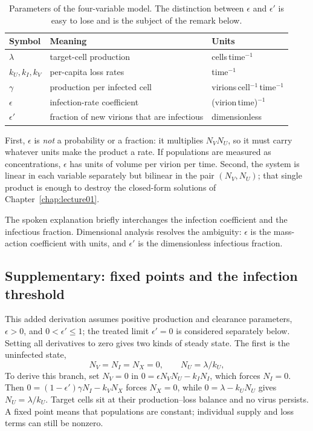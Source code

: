 \begin{table}[H]
\centering\small
\begin{tabular}{@{}l p{6.9cm} l@{}}
\toprule
Symbol & Meaning & Units\\
\midrule
$\lambda$ & target-cell production & cells\,time$^{-1}$\\
$k_U,k_I,k_V$ & per-capita loss rates & time$^{-1}$\\
$\gamma$ & production per infected cell & virions\,cell$^{-1}$\,time$^{-1}$\\
$\epsilon$ & infection-rate coefficient & (virion\,time)$^{-1}$\\
$\epsilon'$ & fraction of new virions that are infectious & dimensionless\\
\bottomrule
\end{tabular}
\caption{Parameters of the four-variable model. The distinction between $\epsilon$ and $\epsilon'$ is easy to lose and is the subject of the remark below.}\label{tab:lec02-params}
\end{table}

First, $\epsilon$ is \emph{not} a probability or a fraction: it multiplies $N_VN_U$, so it must carry whatever units make the product a rate. If populations are measured as concentrations, $\epsilon$ has units of volume per virion per time. Second, the system is linear in each variable separately but bilinear in the pair $(N_V,N_U)$; that single product is enough to destroy the closed-form solutions of Chapter~\ref{chap:lecture01}.

\begin{remark}
The spoken explanation briefly interchanges the infection coefficient and the infectious fraction. Dimensional analysis resolves the ambiguity: $\epsilon$ is the mass-action coefficient with units, and $\epsilon'$ is the dimensionless infectious fraction.
\end{remark}

\subsection{Supplementary: fixed points and the infection threshold}\label{subsec:lec02:fixed}
This added derivation assumes positive production and clearance parameters, $\epsilon>0$, and $0<\epsilon'\leq1$; the treated limit $\epsilon'=0$ is considered separately below. Setting all derivatives to zero gives two kinds of steady state. The first is the uninfected state,
\begin{equation}\label{eq:lec02:uninfected}
N_V=N_I=N_X=0,\qquad N_U=\lambda/k_U,
\end{equation}
To derive this branch, set $N_V=0$ in $0=\epsilon N_VN_U-k_IN_I$, which forces $N_I=0$. Then $0=(1-\epsilon')\gamma N_I-k_VN_X$ forces $N_X=0$, while $0=\lambda-k_UN_U$ gives $N_U=\lambda/k_U$. Target cells sit at their production--loss balance and no virus persists. A fixed point means that populations are constant; individual supply and loss terms can still be nonzero.

